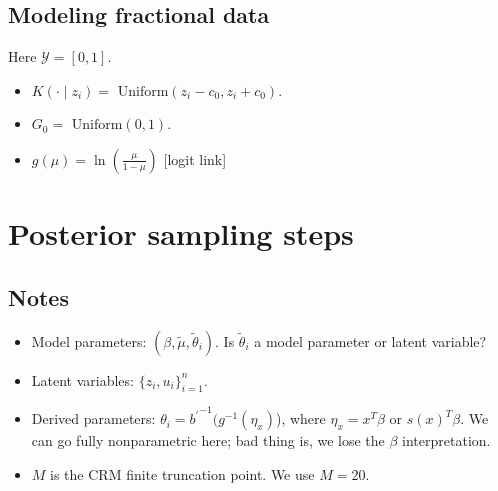 \documentclass[10pt, oneside]{article}   	%
\renewcommand{\th}{\theta}
\newcommand{\sy}{\mathcal{Y}}
\renewcommand{\sy}{\mathcal{Y}}
\newcommand{\red}{\color{red}}
\newcommand{\bla}{\color{black}}
\begin{document}
\subsection{Modeling fractional data}
Here $\sy = [0, 1]$.
\begin{itemize}
    \item $K(\cdot \mid z_i)  = \text{ Uniform}(z_i - c_0, z_i + c_0)$. 
    \item $G_0 = \text{ Uniform}(0, 1)$.
    \item $g(\mu) = \ln(\frac{\mu}{1 - \mu})$ [logit link]
\end{itemize}
  

\section{Posterior sampling steps}
\subsection{Notes}
\begin{itemize}
    \item Model parameters: $(\beta, \widetilde \mu, \widetilde \theta_i)$. \red Is $\widetilde \theta_i$ a model parameter or latent variable? \bla
    \item Latent variables: $\{z_i, u_i\}_{i=1}^n$.  
    \item Derived parameters: $\th_i = {b^\prime}^{-1} (g^{-1}(\eta_x)$), where $\eta_x = x^T\beta$ or $s(x)^T\beta$. We can go fully nonparametric here; bad thing is, we lose the $\beta$ interpretation.
    \item  $M$ is the CRM finite truncation point. We use $M = 20$.
\end{itemize}
\end{document}
